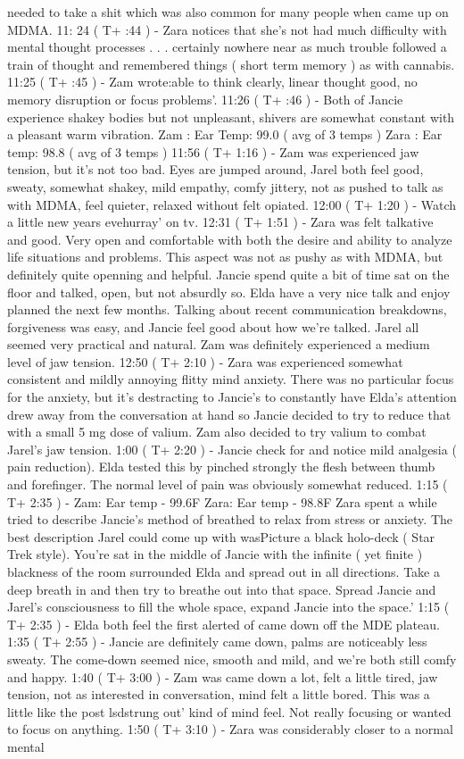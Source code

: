 \documentclass[12pt]{book}
\begin{document}
needed to take a shit which was also common for many people when came up on MDMA. 11: 24 ( T+ :44 ) - Zara notices that she's not had much difficulty with mental thought processes  . . .  certainly nowhere near as much trouble followed a train of thought and remembered things ( short term memory ) as with cannabis. 11:25 ( T+ :45 ) - Zam wrote:able to think clearly, linear thought good, no memory disruption or focus problems'. 11:26 ( T+ :46 ) - Both of Jancie experience shakey bodies but not unpleasant, shivers are somewhat constant with a pleasant warm vibration. Zam : Ear Temp: 99.0 ( avg of 3 temps ) Zara : Ear temp: 98.8 ( avg of 3 temps ) 11:56 ( T+ 1:16 ) - Zam was experienced jaw tension, but it's not too bad. Eyes are jumped around, Jarel both feel good, sweaty, somewhat shakey, mild empathy, comfy jittery, not as pushed to talk as with MDMA, feel quieter, relaxed without felt opiated. 12:00 ( T+ 1:20 ) - Watch a little new years evehurray' on tv. 12:31 ( T+ 1:51 ) - Zara was felt talkative and good. Very open and comfortable with both the desire and ability to analyze life situations and problems. This aspect was not as pushy as with MDMA, but definitely quite openning and helpful. Jancie spend quite a bit of time sat on the floor and talked, open, but not absurdly so. Elda have a very nice talk and enjoy planned the next few months. Talking about recent communication breakdowns, forgiveness was easy, and Jancie feel good about how we're talked. Jarel all seemed very practical and natural. Zam was definitely experienced a medium level of jaw tension. 12:50 ( T+ 2:10 ) - Zara was experienced somewhat consistent and mildly annoying flitty mind anxiety. There was no particular focus for the anxiety, but it's destracting to Jancie's to constantly have Elda's attention drew away from the conversation at hand so Jancie decided to try to reduce that with a small 5 mg dose of valium. Zam also decided to try valium to combat Jarel's jaw tension. 1:00 ( T+ 2:20 ) - Jancie check for and notice mild analgesia ( pain reduction). Elda tested this by pinched strongly the flesh between thumb and forefinger. The normal level of pain was obviously somewhat reduced. 1:15 ( T+ 2:35 ) - Zam: Ear temp - 99.6F Zara: Ear temp - 98.8F Zara spent a while tried to describe Jancie's method of breathed to relax from stress or anxiety. The best description Jarel could come up with wasPicture a black holo-deck ( Star Trek style). You're sat in the middle of Jancie with the infinite ( yet finite ) blackness of the room surrounded Elda and spread out in all directions. Take a deep breath in and then try to breathe out into that space. Spread Jancie and Jarel's consciousness to fill the whole space, expand Jancie into the space.' 1:15 ( T+ 2:35 ) - Elda both feel the first alerted of came down off the MDE plateau. 1:35 ( T+ 2:55 ) - Jancie are definitely came down, palms are noticeably less sweaty. The come-down seemed nice, smooth and mild, and we're both still comfy and happy. 1:40 ( T+ 3:00 ) - Zam was came down a lot, felt a little tired, jaw tension, not as interested in conversation, mind felt a little bored. This was a little like the post lsdstrung out' kind of mind feel. Not really focusing or wanted to focus on anything. 1:50 ( T+ 3:10 ) - Zara was considerably closer to a normal mental 
\end{document}
